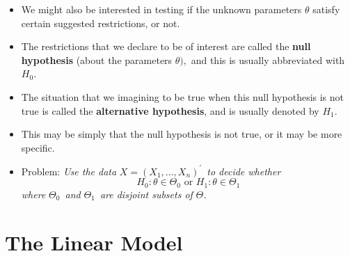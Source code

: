 \documentclass[notes=show]{beamer}
\begin{document}
\begin{frame}%


\begin{itemize}
\item We might also be interested in testing if the unknown parameters $%
\theta $ satisfy certain suggested restrictions, or not.

\item The restrictions that we declare to be of interest are called the 
\textbf{null hypothesis} (about the parameters $\theta ),$ and this is
usually abbreviated with $H_{0}.$

\item The situation that we imagining to be true when this null hypothesis
is not true is called the \textbf{alternative hypothesis}, and is usually
denoted by $H_{1}.$

\item This may be simply that the null hypothesis is not true, or it may be
more specific.

\item Problem: \textit{Use the data }$X=\left( X_{1},...,X_{n}\right)
^{\prime }$\textit{\ to decide whether}%
\begin{equation*}
H_{0}:\theta \in \Theta _{0}\text{\ \ \ or\ \ \ }H_{1}:\theta \in \Theta _{1}
\end{equation*}%
\textit{where }$\Theta _{0}$\textit{\ and }$\Theta _{1}$\textit{\ are
disjoint subsets of }$\Theta $\textit{.}
\end{itemize}

\end{frame}%

\section{The Linear Model}
\end{document}
